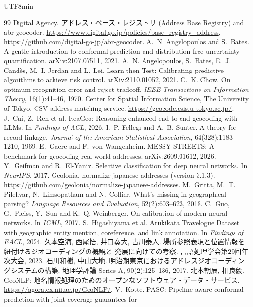 \documentclass[10pt]{article}
\begin{document}
\begin{CJK}{UTF8}{min}
\begin{thebibliography}{99}\small
{} Digital Agency. アドレス・ベース・レジストリ (Address Base Registry) and abr-geocoder.
\url{https://www.digital.go.jp/policies/base_registry_address}, \url{https://github.com/digital-go-jp/abr-geocoder}.
 A.~N. Angelopoulos and S.~Bates. A gentle introduction to conformal prediction
and distribution-free uncertainty quantification. arXiv:2107.07511, 2021.
 A.~N. Angelopoulos, S.~Bates, E.~J. Cand\`es, M.~I. Jordan and L.~Lei. Learn then Test:
Calibrating predictive algorithms to achieve risk control. arXiv:2110.01052, 2021.
 C.~K. Chow. On optimum recognition error and reject tradeoff. \emph{IEEE Transactions
on Information Theory}, 16(1):41--46, 1970.
 Center for Spatial Information Science, The University of Tokyo. CSV address matching
service. \url{https://geocode.csis.u-tokyo.ac.jp/}.
 J.~Cui, Z.~Ren et al. ReaGeo: Reasoning-enhanced end-to-end geocoding with LLMs. In
\emph{Findings of ACL}, 2026.
 I.~P. Fellegi and A.~B. Sunter. A theory for record linkage. \emph{Journal of the
American Statistical Association}, 64(328):1183--1210, 1969.
 E.~Gaere and F.~von Wangenheim. MESSY STREETS: A benchmark for geocoding real-world
addresses. arXiv:2609.01612, 2026.
 Y.~Geifman and R.~El-Yaniv. Selective classification for deep neural networks.
In \emph{NeurIPS}, 2017.
 Geolonia. normalize-japanese-addresses (version 3.1.3).
\url{https://github.com/geolonia/normalize-japanese-addresses}.
 M.~Gritta, M.~T. Pilehvar, N.~Limsopatham and N.~Collier. What's missing in geographical
parsing? \emph{Language Resources and Evaluation}, 52(2):603--623, 2018.
 C.~Guo, G.~Pleiss, Y.~Sun and K.~Q. Weinberger. On calibration of modern neural
networks. In \emph{ICML}, 2017.
 S.~Higashiyama et al. Arukikata Travelogue Dataset with geographic entity mention,
coreference, and link annotation. In \emph{Findings of EACL}, 2024.
 久本空海, 西尾悟, 井口奏大, 古川泰人. 場所参照表現と位置情報を紐付けるジオコーディングの概観と
発展に向けての考察. 言語処理学会第29回年次大会, 2023.
 石川和樹, 中山大地. 明治期東京におけるアドレスジオコーディングシステムの構築. 地理学評論
Series A, 90(2):125--136, 2017.
 北本朝展, 相良毅. GeoNLP: 地名情報処理のためのオープンなソフトウェア・データ・サービス.
\url{https://agora.ex.nii.ac.jp/GeoNLP/}.
 V.~Kotte. PASC: Pipeline-aware conformal prediction with joint coverage guarantees for

\end{thebibliography}
\end{CJK}
\end{document}
